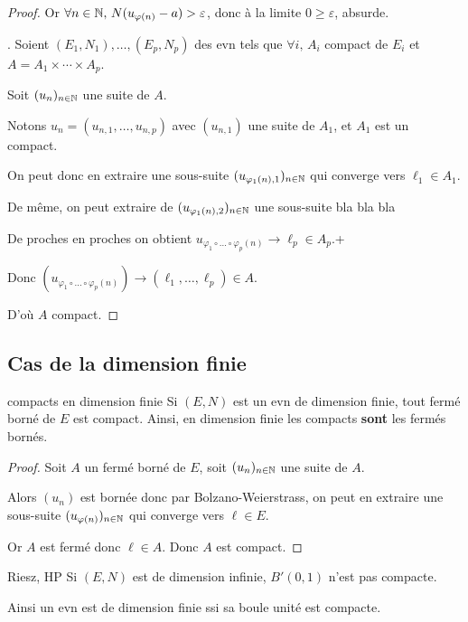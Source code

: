 \begin{proof}
    Or $\forall n \in \mathbb{N}, \, N(u_{\varphi(n)} - a) > \varepsilon$, 
    donc à la limite $0 \geqslant \varepsilon$, absurde.

    . Soient $(E_1, N_1), \ldots, (E_p, N_p)$ des evn tels que 
    $\forall i, \, A_i$ compact de $E_i$ et $A = A_1 \times \cdots \times A_p$. 

    Soit $(u_n)_{n \in \mathbb{N}}$ une suite de $A$.

    Notons $u_n = (u_{n, 1}, \ldots, u_{n, p})$ avec $(u_{n, 1})$ une suite de $A_1$, et $A_1$ est un compact. 

    On peut donc en extraire une sous-suite $(u_{\varphi_1(n), 1})_{n \in \mathbb{N}}$ qui converge vers $\ell_1 \in A_1$.

    De même, on peut extraire de $(u_{\varphi_1(n), 2})_{n \in \mathbb{N}}$ une sous-suite bla bla bla 

    De proches en proches on obtient $u_{\varphi_1 \circ \ldots \circ \varphi_p(n)} \to \ell_p \in A_p$.+

    Donc $(u_{\varphi_1 \circ \ldots \circ \varphi_p(n)}) \to (\ell_1, \ldots, \ell_p) \in A$.

    D'où $A$ compact. 
\end{proof}



\subsection{Cas de la dimension finie }

\begin{theoreme}{compacts en dimension finie }{}
    Si $(E, N)$ est un evn de dimension finie, tout fermé borné de $E$ est compact. Ainsi, en 
    dimension finie les compacts \textbf{sont} les fermés bornés. 
\end{theoreme}


\begin{proof}
    Soit $A$ un fermé borné de $E$, soit $(u_n)_{n \in \mathbb{N}}$ une suite de $A$.

    Alors $(u_n)$ est bornée donc par Bolzano-Weierstrass, on peut en extraire une
    sous-suite $(u_{\varphi(n)})_{n \in \mathbb{N}}$ qui converge vers $\ell \in E$.

    Or $A$ est fermé donc $\ell \in A$. Donc $A$ est compact.
\end{proof}


\begin{theoreme}{Riesz, HP}{}
    Si $(E, N)$ est de dimension infinie, $B'(0, 1)$ n'est pas compacte. 

    Ainsi un evn est de dimension finie ssi sa boule unité est compacte. 
\end{theoreme}

